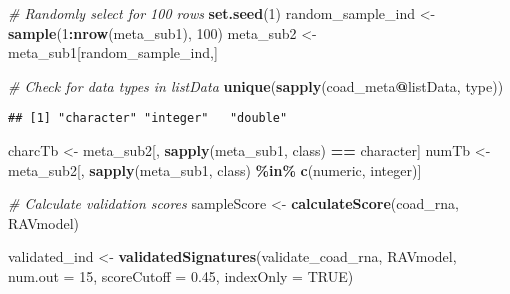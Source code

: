 \documentclass[
]{article}
\newenvironment{Shaded}{\begin{snugshade}}{\end{snugshade}}
\newcommand{\AttributeTok}[1]{\textcolor[rgb]{0.13,0.29,0.53}{#1}}
\newcommand{\CommentTok}[1]{\textcolor[rgb]{0.56,0.35,0.01}{\textit{#1}}}
\newcommand{\ConstantTok}[1]{\textcolor[rgb]{0.56,0.35,0.01}{#1}}
\newcommand{\DecValTok}[1]{\textcolor[rgb]{0.00,0.00,0.81}{#1}}
\newcommand{\FloatTok}[1]{\textcolor[rgb]{0.00,0.00,0.81}{#1}}
\newcommand{\FunctionTok}[1]{\textcolor[rgb]{0.13,0.29,0.53}{\textbf{#1}}}
\newcommand{\NormalTok}[1]{#1}
\newcommand{\OtherTok}[1]{\textcolor[rgb]{0.56,0.35,0.01}{#1}}
\newcommand{\SpecialCharTok}[1]{\textcolor[rgb]{0.81,0.36,0.00}{\textbf{#1}}}
\newcommand{\StringTok}[1]{\textcolor[rgb]{0.31,0.60,0.02}{#1}}
\begin{document}
\begin{Shaded}
\begin{Highlighting}[]
\CommentTok{\# Randomly select for 100 rows}
\FunctionTok{set.seed}\NormalTok{(}\DecValTok{1}\NormalTok{)}
\NormalTok{random\_sample\_ind }\OtherTok{\textless{}{-}} \FunctionTok{sample}\NormalTok{(}\DecValTok{1}\SpecialCharTok{:}\FunctionTok{nrow}\NormalTok{(meta\_sub1), }\DecValTok{100}\NormalTok{)}
\NormalTok{meta\_sub2 }\OtherTok{\textless{}{-}}\NormalTok{ meta\_sub1[random\_sample\_ind,]}
\end{Highlighting}
\end{Shaded}

\begin{Shaded}
\begin{Highlighting}[]
\CommentTok{\# Check for data types in listData}
\FunctionTok{unique}\NormalTok{(}\FunctionTok{sapply}\NormalTok{(coad\_meta}\SpecialCharTok{@}\NormalTok{listData, type))}
\end{Highlighting}
\end{Shaded}

\begin{verbatim}
## [1] "character" "integer"   "double"
\end{verbatim}

\begin{Shaded}
\begin{Highlighting}[]
\NormalTok{charcTb }\OtherTok{\textless{}{-}}\NormalTok{ meta\_sub2[, }\FunctionTok{sapply}\NormalTok{(meta\_sub1, class) }\SpecialCharTok{==} \StringTok{\textquotesingle{}character\textquotesingle{}}\NormalTok{]}
\NormalTok{numTb }\OtherTok{\textless{}{-}}\NormalTok{ meta\_sub2[, }\FunctionTok{sapply}\NormalTok{(meta\_sub1, class) }\SpecialCharTok{\%in\%} \FunctionTok{c}\NormalTok{(}\StringTok{\textquotesingle{}numeric\textquotesingle{}}\NormalTok{, }\StringTok{\textquotesingle{}integer\textquotesingle{}}\NormalTok{)]}
\end{Highlighting}
\end{Shaded}

\begin{Shaded}
\begin{Highlighting}[]
\CommentTok{\# Calculate validation scores}
\NormalTok{sampleScore }\OtherTok{\textless{}{-}} \FunctionTok{calculateScore}\NormalTok{(coad\_rna, RAVmodel)}
\end{Highlighting}
\end{Shaded}

\begin{Shaded}
\begin{Highlighting}[]
\NormalTok{validated\_ind }\OtherTok{\textless{}{-}} \FunctionTok{validatedSignatures}\NormalTok{(validate\_coad\_rna, RAVmodel, }\AttributeTok{num.out =} \DecValTok{15}\NormalTok{, }\AttributeTok{scoreCutoff =} \FloatTok{0.45}\NormalTok{, }\AttributeTok{indexOnly =} \ConstantTok{TRUE}\NormalTok{)}
\end{Highlighting}
\end{Shaded}
\end{document}
